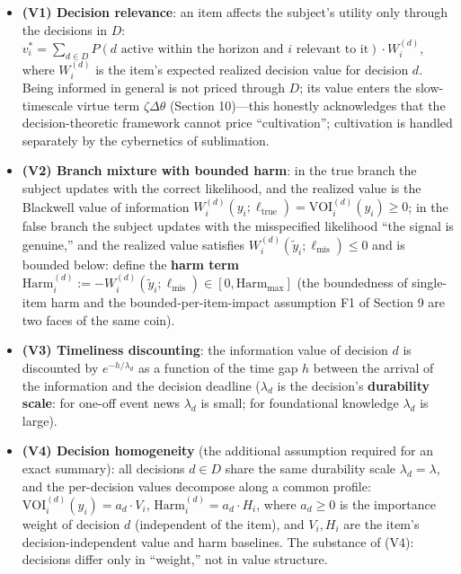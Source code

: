 \documentclass[
  11pt]{article}
\providecommand{\tightlist}{%
  \setlength{\itemsep}{0pt}\setlength{\parskip}{0pt}}
\begin{document}
\begin{itemize}
\tightlist
\item
  \textbf{(V1) Decision relevance}: an item affects the subject's
  utility only through the decisions in \(D\):
  \(v_i^* = \sum_{d \in D} P(d \text{ active within the horizon and } i \text{ relevant to it}) \cdot W_i^{(d)}\),
  where \(W_i^{(d)}\) is the item's expected realized decision value for
  decision \(d\). Being informed in general is not priced through \(D\);
  its value enters the slow-timescale virtue term \(\zeta \Delta\theta\)
  (Section 10)---this honestly acknowledges that the decision-theoretic
  framework cannot price ``cultivation''; cultivation is handled
  separately by the cybernetics of sublimation.
\item
  \textbf{(V2) Branch mixture with bounded harm}: in the true branch the
  subject updates with the correct likelihood, and the realized value is
  the Blackwell value of information
  \(W_i^{(d)}(y_i;\ell_{\mathrm{true}}) = \mathrm{VOI}_i^{(d)}(y_i) \ge 0\);
  in the false branch the subject updates with the misspecified
  likelihood ``the signal is genuine,'' and the realized value satisfies
  \(W_i^{(d)}(\tilde y_i;\ell_{\mathrm{mis}}) \le 0\) and is bounded
  below: define the \textbf{harm term}
  \(\mathrm{Harm}_i^{(d)} := -W_i^{(d)}(\tilde y_i;\ell_{\mathrm{mis}}) \in [0, \mathrm{Harm}_{\max}]\)
  (the boundedness of single-item harm and the bounded-per-item-impact
  assumption F1 of Section 9 are two faces of the same coin).
\item
  \textbf{(V3) Timeliness discounting}: the information value of
  decision \(d\) is discounted by \(e^{-h/\lambda_d}\) as a function of
  the time gap \(h\) between the arrival of the information and the
  decision deadline (\(\lambda_d\) is the decision's \textbf{durability
  scale}: for one-off event news \(\lambda_d\) is small; for
  foundational knowledge \(\lambda_d\) is large).
\item
  \textbf{(V4) Decision homogeneity} (the additional assumption required
  for an exact summary): all decisions \(d \in D\) share the same
  durability scale \(\lambda_d = \lambda\), and the per-decision values
  decompose along a common profile:
  \(\mathrm{VOI}_i^{(d)}(y_i) = a_d \cdot V_i\),
  \(\mathrm{Harm}_i^{(d)} = a_d \cdot H_i\), where \(a_d \ge 0\) is the
  importance weight of decision \(d\) (independent of the item), and
  \(V_i, H_i\) are the item's decision-independent value and harm
  baselines. The substance of (V4): decisions differ only in ``weight,''
  not in value structure.

\end{itemize}
\end{document}

